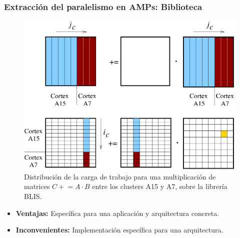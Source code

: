 \documentclass[10pt]{beamer}
\begin{document}



\begin{frame}
  \frametitle{Extracción del paralelismo en AMPs: Biblioteca}
  \begin{figure}[th!]
    \begin{center}
      \includegraphics[width=0.5\columnwidth]{Figures/A15vsA7.pdf}
    \end{center}
    \caption{\label{fig:A15vsA7} Distribución de la carga de trabajo para
      una multiplicación de matrices $C \mathrel{+}= A \cdot B$
      entre los clusters A15 y A7, sobre la librería BLIS.}
  \end{figure}

  \begin{itemize}
  \item {\bf Ventajas:} Específica para una aplicación y arquitectura concreta.
  \item {\bf Inconvenientes:} Implementación específica para una arquitectura.
  \end{itemize}    
\end{frame}


\end{document}
